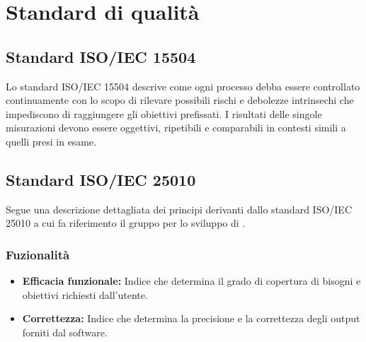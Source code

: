 \chapter{Standard di qualità}
\section{Standard ISO/IEC 15504}
Lo standard ISO/IEC 15504 descrive come ogni processo debba essere controllato continuamente con lo scopo di rilevare possibili rischi e debolezze intrinsechi che impediscono di raggiungere gli obiettivi prefissati. I risultati delle singole misurazioni devono essere oggettivi, ripetibili e comparabili in contesti simili a quelli presi in esame. 
\section{Standard ISO/IEC 25010}
Segue una descrizione dettagliata dei principi derivanti dallo standard ISO/IEC 25010 a cui fa riferimento il gruppo per lo sviluppo di .

\subsection{Fuzionalità}
\begin{itemize}
	\item \textbf{Efficacia funzionale:} Indice che determina il grado di copertura di bisogni e obiettivi richiesti dall'utente.
	\item \textbf{Correttezza:} Indice che determina la precisione e la correttezza degli output forniti dal software.
\end{itemize}
